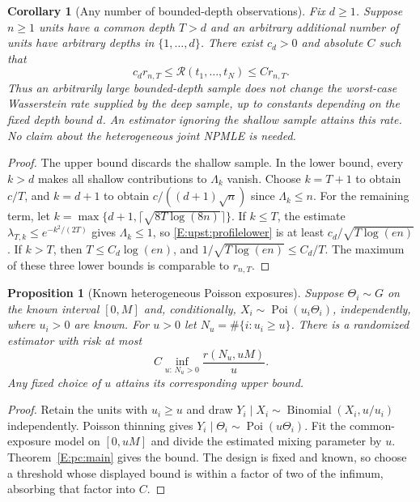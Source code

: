 \documentclass[11pt,a4paper]{article}
\newtheorem{proposition}[theorem]{Proposition}
\newtheorem{corollary}[theorem]{Corollary}
\theoremstyle{definition}
\theoremstyle{remark}
\numberwithin{equation}{section}
\begin{document}
\begin{corollary}[Any number of bounded-depth observations]
\label{E:upst:shallow}
Fix $d\ge1$. Suppose $n\ge1$ units have a common depth $T>d$ and
an arbitrary additional number of units have arbitrary depths in
$\{1,\ldots,d\}$. There exist $c_d>0$ and absolute $C$ such that
\[
 c_d r_{n,T}\le\mathcal R(t_1,\ldots,t_N)\le C r_{n,T}.
\]
Thus an arbitrarily large bounded-depth sample does not change the
worst-case Wasserstein rate supplied by the deep sample, up to constants
depending on the fixed depth bound $d$. An estimator ignoring the shallow
sample attains this rate. No claim about the heterogeneous joint NPMLE
is needed.
\end{corollary}
\begin{proof}
The upper bound discards the shallow sample. In the lower bound,
every $k>d$ makes all shallow contributions to $\Lambda_k$ vanish.
Choose $k=T+1$ to obtain $c/T$, and $k=d+1$ to obtain
$c/((d+1)\sqrt n)$ since $\Lambda_k\le n$.
For the remaining term, let
$k=\max\{d+1,\lceil\sqrt{8T\log(8n)}\rceil\}$.
If $k\le T$, the estimate
$\lambda_{T,k}\le e^{-k^2/(2T)}$ gives $\Lambda_k\le1$,
so \eqref{E:upst:profilelower} is at least
$c_d/\sqrt{T\log(en)}$. If $k>T$, then
$T\le C_d\log(en)$, and $1/\sqrt{T\log(en)}\le C_d/T$.
The maximum of these three lower bounds is comparable to $r_{n,T}$.
\end{proof}

\begin{proposition}[Known heterogeneous Poisson exposures]
\label{E:upst:poithin}
Suppose $\Theta_i\sim G$ on the known interval $[0,M]$ and,
conditionally, $X_i\sim\operatorname{Poi}(u_i\Theta_i)$, independently,
where $u_i>0$ are known. For $u>0$ let $N_u=\#\{i:u_i\ge u\}$.
There is a randomized estimator with risk at most
\[
 C\inf_{u:\,N_u>0}\frac{r(N_u,uM)}u.
\]
Any fixed choice of $u$ attains its corresponding upper bound.
\end{proposition}
\begin{proof}
Retain the units with $u_i\ge u$ and draw
$Y_i\mid X_i\sim\operatorname{Binomial}(X_i,u/u_i)$ independently.
Poisson thinning gives $Y_i\mid\Theta_i\sim\operatorname{Poi}(u\Theta_i)$.
Fit the common-exposure model on $[0,uM]$ and divide the estimated
mixing parameter by $u$. Theorem~\ref{E:pc:main} gives the bound.
The design is fixed and known, so choose a threshold whose displayed
bound is within a factor of two of the infimum, absorbing that factor
into $C$.
\end{proof}
\end{document}
